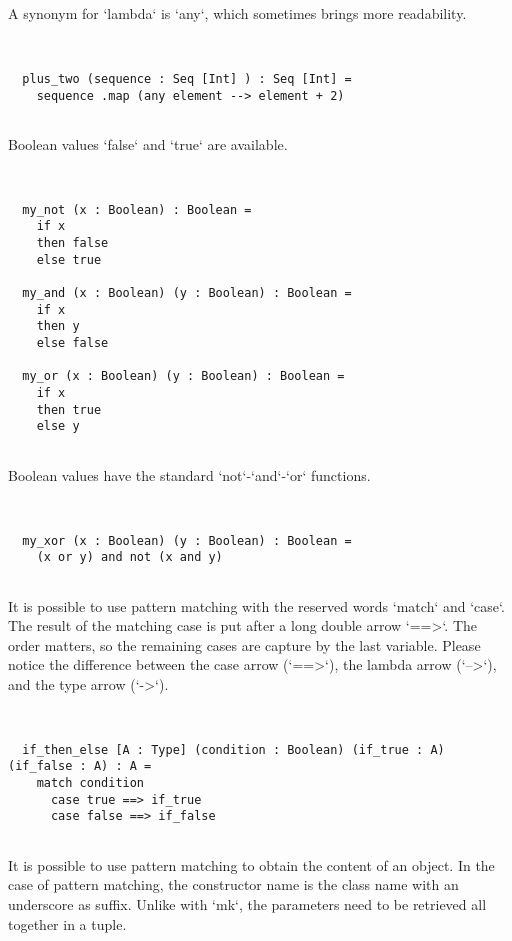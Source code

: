 \documentclass[12pt,a4paper]{article}
\begin{document}
A synonym for `lambda` is `any`, which sometimes brings more readability.


\begin{lstlisting}


  plus_two (sequence : Seq [Int] ) : Seq [Int] =
    sequence .map (any element --> element + 2)


\end{lstlisting}

Boolean values `false` and `true` are available.


\begin{lstlisting}


  my_not (x : Boolean) : Boolean =
    if x
    then false
    else true

  my_and (x : Boolean) (y : Boolean) : Boolean =
    if x
    then y
    else false

  my_or (x : Boolean) (y : Boolean) : Boolean =
    if x
    then true
    else y


\end{lstlisting}

Boolean values have the standard `not`-`and`-`or` functions.


\begin{lstlisting}


  my_xor (x : Boolean) (y : Boolean) : Boolean =
    (x or y) and not (x and y)


\end{lstlisting}

It is possible to use pattern matching with the reserved words `match` and `case`.
The result of the matching case is put after a long double arrow `==>`.
The order matters, so the remaining cases are capture by the last variable.
Please notice the difference between the case arrow (`==>`), the lambda arrow (`-->`), and
the type arrow (`->`).


\begin{lstlisting}


  if_then_else [A : Type] (condition : Boolean) (if_true : A) (if_false : A) : A =
    match condition
      case true ==> if_true
      case false ==> if_false


\end{lstlisting}

It is possible to use pattern matching to obtain the content of an object.
In the case of pattern matching, the constructor name is the class name with an underscore
as suffix.
Unlike with `mk`, the parameters need to be retrieved all together in a tuple.
\end{document}
